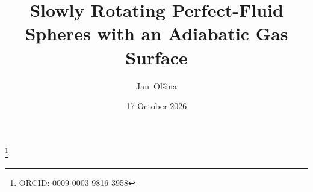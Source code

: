 \documentclass[aps,prd,reprint,a4paper,nofootinbib,floatfix]{revtex4-2}
\begin{document}
\title{Slowly Rotating Perfect-Fluid Spheres with an Adiabatic Gas Surface}
\author{Jan~Ol\v{s}ina}
\thanks{ORCID: \href{https://orcid.org/0009-0003-9816-3958}{0009-0003-9816-3958}}
\date{17 October 2026}
\end{document}
